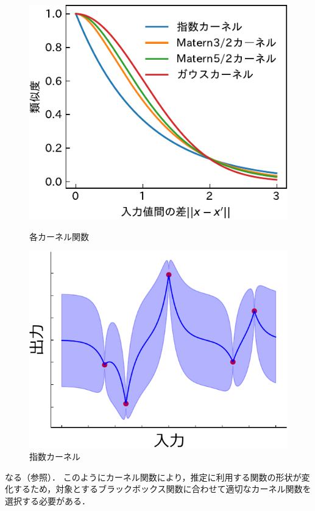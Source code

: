 \documentclass[twocolumn]{ltjarticle}
\begin{document}
\begin{figure}[H]
	\begin{minipage}[t]{0.5\columnwidth}
		\centering
		\includegraphics[width=\columnwidth]{./figures/kernel-crop.pdf}
		\vspace*{-0.8cm}
		\caption{各カーネル関数} \label{fig:matern_graph}
	\end{minipage}
	\begin{minipage}[t]{0.47\columnwidth}
		\centering
		\includegraphics[width=\columnwidth]{figures/material_8_exp.pdf}
		\vspace*{-0.8cm}
		\caption{指数カーネル} \label{fig:exp_kernel}
	\end{minipage}
\end{figure}
\noindent
なる（参照）．
このようにカーネル関数により，推定に利用する関数の形状が変化するため，対象とするブラックボックス関数に合わせて適切なカーネル関数を選択する必要がある．
\end{document}
